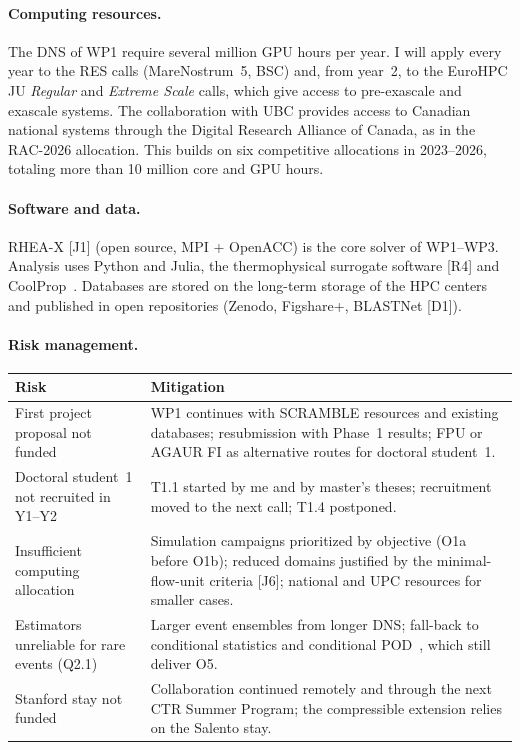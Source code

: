 \documentclass[11pt]{article}
\begin{document}
\paragraph{Computing resources.} The DNS of WP1 require several million GPU hours per year. I will apply every year to the RES calls (MareNostrum~5, BSC) and, from year~2, to
the EuroHPC JU \emph{Regular} and \emph{Extreme Scale} calls, which give access to
pre-exascale and exascale systems. The collaboration with UBC provides access to Canadian
national systems through the Digital Research Alliance of Canada, as in the RAC-2026
allocation. This builds on six competitive allocations in 2023--2026, totaling more than 10
million core and GPU hours.

\paragraph{Software and data.} RHEA-X [J1] (open source, MPI + OpenACC) is the core solver of
WP1--WP3. Analysis uses Python and Julia, the thermophysical surrogate software [R4] and
CoolProp~\cite{CoolProp2014}. Databases are stored on the long-term storage of the HPC centers
and published in open repositories (Zenodo, Figshare+, BLASTNet [D1]).

\paragraph{Risk management.}
\begin{center}\small
\begin{tabularx}{\textwidth}{@{}>{\raggedright\arraybackslash}p{4.4cm}X@{}}
\toprule
\textbf{Risk} & \textbf{Mitigation} \\
\midrule
First project proposal not funded & WP1 continues with SCRAMBLE resources and existing databases; resubmission with Phase~1 results; FPU or AGAUR FI as alternative routes for doctoral student~1. \\
Doctoral student~1 not recruited in Y1--Y2 & T1.1 started by me and by master's theses; recruitment moved to the next call; T1.4 postponed. \\
Insufficient computing allocation & Simulation campaigns prioritized by objective (O1a before O1b); reduced domains justified by the minimal-flow-unit criteria [J6]; national and UPC resources for smaller cases. \\
Estimators unreliable for rare events (Q2.1) & Larger event ensembles from longer DNS; fall-back to conditional statistics and conditional POD~\cite{Martin2025}, which still deliver O5. \\
Stanford stay not funded & Collaboration continued remotely and through the next CTR Summer Program; the compressible extension relies on the Salento stay. \\
\bottomrule
\end{tabularx}
\end{center}
\end{document}
